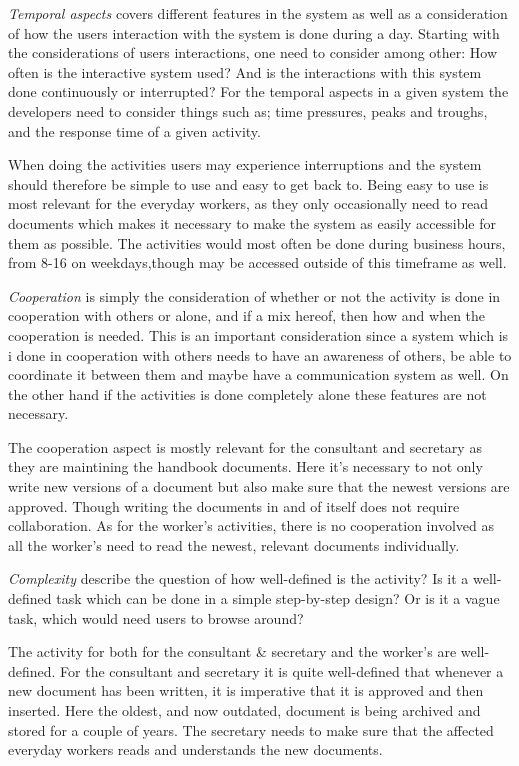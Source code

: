 \textit{Temporal aspects} covers different features in the system as well as a consideration of how the users interaction with the system is done during a day.
Starting with the considerations of users interactions, one need to consider among other: How often is the interactive system used? And is the interactions with this system done continuously or interrupted?
For the temporal aspects in a given system the developers need to consider things such as; time pressures, peaks and troughs, and the response time of a given activity. \citep{Benyon}

When doing the activities users may experience interruptions and the system should therefore be simple to use and easy to get back to.
Being easy to use is most relevant for the everyday workers, as they only occasionally need to read documents which makes it necessary to make the system as easily accessible for them as possible.
The activities would most often be done during business hours, from 8-16 on weekdays,though may be accessed outside of this timeframe as well.

\textit{Cooperation} is simply the consideration of whether or not the activity is done in cooperation with others or alone, and if a mix hereof, then how and when the cooperation is needed.
This is an important consideration since a system which is i done in cooperation with others needs to have an awareness of others, be able to coordinate it between them and maybe have a communication system as well.
On the other hand if the activities is done completely alone these features are not necessary. \citep{Benyon}

The cooperation aspect is mostly relevant for the consultant and secretary as they are maintining the handbook documents. 
Here it's necessary to not only write new versions of a document but also make sure that the newest versions are approved. 
Though writing the documents in and of itself does not require collaboration.
As for the worker's activities, there is no cooperation involved as all the worker's need to read the newest, relevant documents individually.

\textit{Complexity} describe the question of how well-defined is the activity?
Is it a well-defined task which can be done in a simple step-by-step design?
Or is it a vague task, which would need users to browse around? \citep{Benyon}

The activity for both for the consultant \& secretary and the worker's are well-defined. 
For the consultant and secretary it is quite well-defined that whenever a new document has been written, it is imperative that it is approved and then inserted.
Here the oldest, and now outdated, document is being archived and stored for a couple of years.
The secretary needs to make sure that the affected everyday workers reads and understands the new documents.

